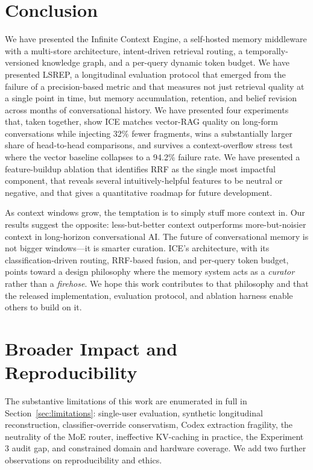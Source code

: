 \documentclass[10pt]{article}
\begin{document}
\section{Conclusion}
\label{sec:conclusion}

We have presented the Infinite Context Engine, a self-hosted memory middleware with a multi-store architecture, intent-driven retrieval routing, a temporally-versioned knowledge graph, and a per-query dynamic token budget. We have presented LSREP, a longitudinal evaluation protocol that emerged from the failure of a precision-based metric and that measures not just retrieval quality at a single point in time, but memory accumulation, retention, and belief revision across months of conversational history. We have presented four experiments that, taken together, show ICE matches vector-RAG quality on long-form conversations while injecting 32\% fewer fragments, wins a substantially larger share of head-to-head comparisons, and survives a context-overflow stress test where the vector baseline collapses to a 94.2\% failure rate. We have presented a feature-buildup ablation that identifies RRF as the single most impactful component, that reveals several intuitively-helpful features to be neutral or negative, and that gives a quantitative roadmap for future development.

As context windows grow, the temptation is to simply stuff more context in. Our results suggest the opposite: less-but-better context outperforms more-but-noisier context in long-horizon conversational AI. The future of conversational memory is not bigger windows---it is smarter curation. ICE's architecture, with its classification-driven routing, RRF-based fusion, and per-query token budget, points toward a design philosophy where the memory system acts as a \emph{curator} rather than a \emph{firehose}. We hope this work contributes to that philosophy and that the released implementation, evaluation protocol, and ablation harness enable others to build on it.

\section*{Broader Impact and Reproducibility}

The substantive limitations of this work are enumerated in full in Section~\ref{sec:limitations}: single-user evaluation, synthetic longitudinal reconstruction, classifier-override conservatism, Codex extraction fragility, the neutrality of the MoE router, ineffective KV-caching in practice, the Experiment 3 audit gap, and constrained domain and hardware coverage. We add two further observations on reproducibility and ethics.
\end{document}
